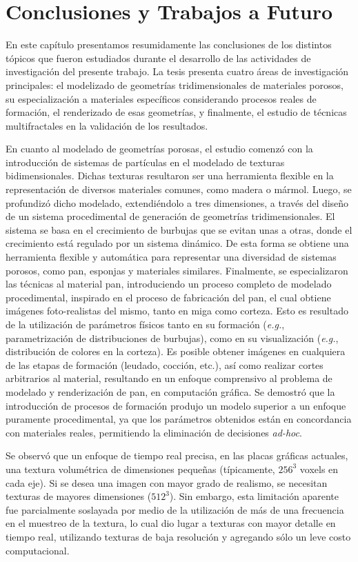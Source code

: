 \chapter{Conclusiones y Trabajos a Futuro}
En este capítulo presentamos resumidamente las conclusiones de los distintos tópicos que fueron estudiados durante el desarrollo de las actividades de investigación del presente trabajo.
La tesis presenta cuatro áreas de investigación principales: el modelizado de geometrías tridimensionales de materiales porosos, su especialización a materiales específicos considerando procesos reales de formación, el renderizado de esas geometrías, y finalmente, el estudio de técnicas multifractales en la validación de los resultados.

En cuanto al modelado de geometrías porosas, el estudio comenzó con la introducción de sistemas de partículas en el modelado de texturas bidimensionales.
Dichas texturas resultaron ser una herramienta flexible en la representación de diversos materiales comunes, como madera o mármol.
Luego, se profundizó dicho modelado, extendiéndolo a tres dimensiones, a través del diseño de un sistema procedimental de generación de geometrías tridimensionales.
El sistema se basa en el crecimiento de burbujas que se evitan unas a otras, donde el crecimiento está regulado por un sistema dinámico.
De esta forma se obtiene una herramienta flexible y automática para representar una diversidad de sistemas porosos, como pan, esponjas y materiales similares.
Finalmente, se especializaron las técnicas al material pan, introduciendo un proceso completo de modelado procedimental, inspirado en el proceso de fabricación del pan, el cual obtiene imágenes foto-realistas del mismo, tanto en miga como corteza.
Esto es resultado de la utilización de parámetros físicos tanto en su formación ({\em e.g.}, parametrización de distribuciones de burbujas), como en su visualización ({\em e.g.}, distribución de colores en la corteza).
Es posible obtener imágenes en cualquiera de las etapas de formación (leudado, cocción, etc.), así como realizar cortes arbitrarios al material, resultando en un enfoque comprensivo al problema de modelado y renderización de pan, en computación gráfica.
Se demostró que la introducción de procesos de formación produjo un modelo superior a un enfoque puramente procedimental, ya que los parámetros obtenidos están en concordancia con materiales reales, permitiendo la eliminación de decisiones {\em ad-hoc}.

Se observó que un enfoque de tiempo real precisa, en las placas gráficas actuales, una textura volumétrica de dimensiones pequeñas (típicamente, $256^{3}$ voxels en cada eje).
Si se desea una imagen con mayor grado de realismo, se necesitan texturas de mayores dimensiones ($512^{3}$).
Sin embargo, esta limitación aparente fue parcialmente soslayada por medio de la utilización de más de una frecuencia en el muestreo de la textura, lo cual dio lugar a texturas con mayor detalle en tiempo real, utilizando texturas de baja resolución y agregando sólo un leve costo computacional.

